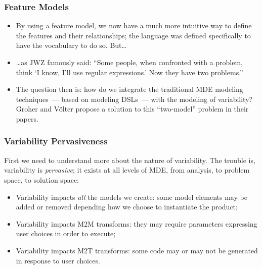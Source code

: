 \documentclass{beamer}
\begin{document}
\begin{frame}
\frametitle{Feature Models}

\begin{itemize}

\item By using a feature model, we now have a much more intuitive way
  to define the features and their relationships; the language was
  defined specifically to have the vocabulary to do so. But\ldots

  \pause{}

\item \ldots as JWZ famously said: \enquote{Some people, when
  confronted with a problem, think \enquote{I know, I'll use regular
    expressions.} Now they have two problems.}

  \pause{}

\item The question then is: how do we integrate the traditional
  \ac{MDE} modeling techniques~--- based on modeling \ac{DSL}s~---
  with the modeling of variability? Groher and V{\"o}lter propose a
  solution to this \enquote{two-model} problem in their papers.

\end{itemize}

\end{frame}

\begin{frame}
\frametitle{Variability Pervasiveness}

First we need to understand more about the nature of variability. The
trouble is, variability is \emph{pervasive}; it exists at all levels
of \ac{MDE}, from analysis, to problem space, to solution space:

\pause{}

\begin{itemize}
\item Variability impacts \emph{all} the models we create: some
  model elements may be added or removed depending how we choose to
  instantiate the product;

  \pause{}

\item Variability impacts \ac{M2M} transforms: they may require
  parameters expressing user choices in order to execute;

  \pause{}

\item Variability impacts \ac{M2T} transforms: some code may or may
  not be generated in response to user choices.

\end{itemize}

\end{frame}
\end{document}
